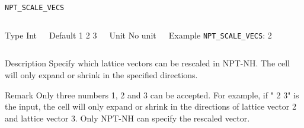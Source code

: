 \begin{frame}[allowframebreaks]{\texttt{NPT\_SCALE\_VECS}} \label{NPT_SCALE_VECS}
\vspace*{-12pt}
\begin{columns}
\begin{block}{Type}
Int
\end{block}

\begin{block}{Default}
1 2 3
\end{block}

\begin{block}{Unit}
No unit
\end{block}

\begin{block}{Example}
\texttt{NPT\_SCALE\_VECS}: 2
\end{block}
\end{columns}

\begin{block}{Description}
Specify which lattice vectors can be rescaled in NPT-NH. The cell will only expand or shrink in the specified directions.
\end{block}

\begin{block}{Remark}
Only three numbers 1, 2 and 3 can be accepted. For example, if " 2 3" is the input, the cell will only expand or shrink in the directions of lattice vector 2 and lattice vector 3. Only NPT-NH can specify the rescaled vector.
\end{block}

\end{frame}



